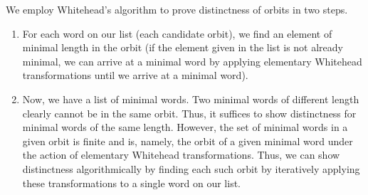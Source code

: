 \documentclass[11pt]{article}
\begin{document}
We employ Whitehead's algorithm to prove distinctness of orbits in two steps.
\begin{enumerate}
\item For each word on our list (each candidate orbit), we find an element of minimal length in the orbit (if the element given in the list is not already minimal, we can arrive at a minimal word by applying elementary Whitehead transformations until we arrive at a minimal word).
\item Now, we have a list of minimal words. Two minimal words of different length clearly cannot be in the same orbit. Thus, it suffices to show distinctness for minimal words of the same length. However, the set of minimal words in a given orbit is finite and is, namely, the orbit of a given minimal word under the action of elementary Whitehead transformations. Thus, we can show distinctness algorithmically by finding each such orbit by iteratively applying these transformations to a single word on our list.
\end{enumerate}
\end{document}
